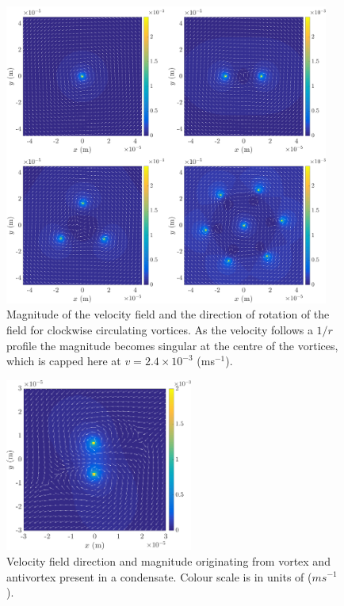 \begin{figure}\centering
    \includegraphics[width=0.95\textwidth]{Images/ch4_vtx/velocity/velocity_fixedmag}
    \caption{Magnitude of the velocity field and the direction of rotation of the field for clockwise circulating vortices. As the velocity follows a $1/r$ profile the magnitude becomes singular at the centre of the vortices, which is capped here at $v=2.4\times 10^{-3}$ (ms$^{-1}$).}
    \label{fig:vel_field}
\end{figure}

\begin{figure}\centering
    \includegraphics[width=0.55\textwidth]{Images/ch4_vtx/vtx_anti_velfield}
    \caption{Velocity field direction and magnitude originating from vortex and antivortex present in a condensate. Colour scale is in units of ($ms^{-1}$).}
    \label{fig:vel_pm}
\end{figure}

